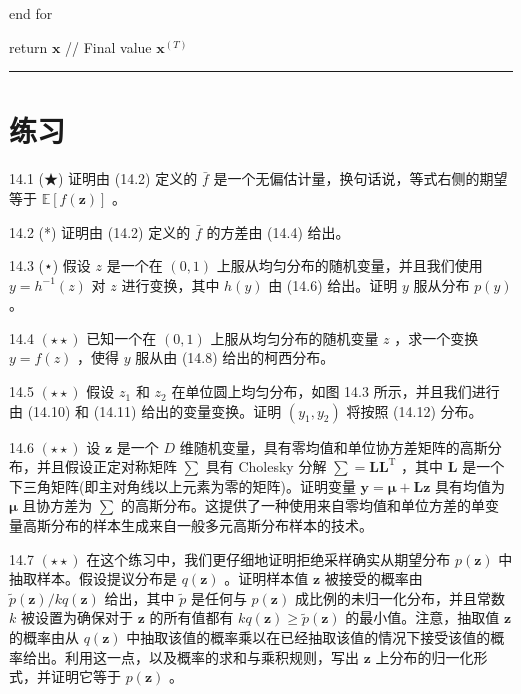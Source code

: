 \documentclass[10pt]{report}
\newcommand{\HRule}{\begin{center}\rule{0.9\linewidth}{0.2mm}\end{center}}
\begin{document}
end for

return \(\mathbf{x}\) // Final value \({\mathbf{x}}^{\left( T\right) }\)

\HRule

\section*{练习}

14.1 (★) 证明由 (14.2) 定义的 \(\bar{f}\) 是一个无偏估计量，换句话说，等式右侧的期望等于 \(\mathbb{E}\left\lbrack  {f\left( \mathbf{z}\right) }\right\rbrack\) 。

14.2 (*) 证明由 (14.2) 定义的 \(\bar{f}\) 的方差由 (14.4) 给出。

14.3 (⋆) 假设 \(z\) 是一个在 \(\left( {0,1}\right)\) 上服从均匀分布的随机变量，并且我们使用 \(y = {h}^{-1}\left( z\right)\) 对 \(z\) 进行变换，其中 \(h\left( y\right)\) 由 (14.6) 给出。证明 \(y\) 服从分布 \(p\left( y\right)\) 。

14.4 \(\left( {\star  \star  }\right)\) 已知一个在 \(\left( {0,1}\right)\) 上服从均匀分布的随机变量 \(z\) ，求一个变换 \(y = f\left( z\right)\) ，使得 \(y\) 服从由 (14.8) 给出的柯西分布。

14.5 \(\left( {\star  \star  }\right)\) 假设 \({z}_{1}\) 和 \({z}_{2}\) 在单位圆上均匀分布，如图 14.3 所示，并且我们进行由 (14.10) 和 (14.11) 给出的变量变换。证明 \(\left( {{y}_{1},{y}_{2}}\right)\) 将按照 (14.12) 分布。

14.6 \(\left( {\star  \star  }\right)\) 设 \(\mathbf{z}\) 是一个 \(D\) 维随机变量，具有零均值和单位协方差矩阵的高斯分布，并且假设正定对称矩阵 \(\mathbf{\sum }\) 具有 Cholesky 分解 \(\mathbf{\sum } = \mathbf{L}{\mathbf{L}}^{\mathrm{T}}\) ，其中 \(\mathbf{L}\) 是一个下三角矩阵(即主对角线以上元素为零的矩阵)。证明变量 \(\mathbf{y} = \mathbf{\mu } + \mathbf{L}\mathbf{z}\) 具有均值为 \(\mathbf{\mu }\) 且协方差为 \(\mathbf{\sum }\) 的高斯分布。这提供了一种使用来自零均值和单位方差的单变量高斯分布的样本生成来自一般多元高斯分布样本的技术。

14.7 \(\left( {\star  \star  }\right)\) 在这个练习中，我们更仔细地证明拒绝采样确实从期望分布 \(p\left( \mathbf{z}\right)\) 中抽取样本。假设提议分布是 \(q\left( \mathbf{z}\right)\) 。证明样本值 \(\mathbf{z}\) 被接受的概率由 \(\widetilde{p}\left( \mathbf{z}\right) /{kq}\left( \mathbf{z}\right)\) 给出，其中 \(\widetilde{p}\) 是任何与 \(p\left( \mathbf{z}\right)\) 成比例的未归一化分布，并且常数 \(k\) 被设置为确保对于 \(\mathbf{z}\) 的所有值都有 \({kq}\left( \mathbf{z}\right)  \geq  \widetilde{p}\left( \mathbf{z}\right)\) 的最小值。注意，抽取值 \(\mathbf{z}\) 的概率由从 \(q\left( \mathbf{z}\right)\) 中抽取该值的概率乘以在已经抽取该值的情况下接受该值的概率给出。利用这一点，以及概率的求和与乘积规则，写出 \(\mathbf{z}\) 上分布的归一化形式，并证明它等于 \(p\left( \mathbf{z}\right)\) 。
\end{document}
